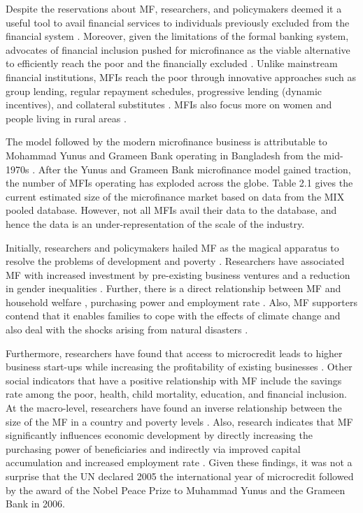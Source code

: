 \documentclass[a4paper,nobind]{templates/ociamthesis}
\begin{document}
Despite the reservations about MF, researchers, and policymakers deemed it a useful tool to avail financial services to individuals previously excluded from the financial system \autocite{d2017ngos}. Moreover, given the limitations of the formal banking system, advocates of financial inclusion pushed for microfinance as the viable alternative to efficiently reach the poor and the financially excluded \autocite{chester2016one}. Unlike mainstream financial institutions, MFIs reach the poor through innovative approaches such as group lending, regular repayment schedules, progressive lending (dynamic incentives), and collateral substitutes \autocite{chester2016one}. MFIs also focus more on women and people living in rural areas \autocite{ghosh2013microfinance}.

The model followed by the modern microfinance business is attributable to Mohammad Yunus and Grameen Bank operating in Bangladesh from the mid-1970s \autocite{ghosh2013microfinance}. After the Yunus and Grameen Bank microfinance model gained traction, the number of MFIs operating has exploded across the globe. Table 2.1 gives the current estimated size of the microfinance market based on data from the MIX pooled database. However, not all MFIs avail their data to the database, and hence the data is an under-representation of the scale of the industry.

Initially, researchers and policymakers hailed MF as the magical apparatus to resolve the problems of development and poverty \autocite{ghosh2013microfinance}. Researchers have associated MF with increased investment by pre-existing business ventures \textcite{newman2017microfinance} and a reduction in gender inequalities \autocites{shahriar2017lender}[@][]{newman2017microfinance,mafukata2017reciprocal,zhang2017microfinance}. Further, there is a direct relationship between MF and household welfare \autocite{meador2017food,you2013role}, purchasing power and employment rate \autocite{lopatta2016microfinance,raihan2017macro}. Also, MF supporters contend that it enables families to cope with the effects of climate change \textcite{fenton2017role} and also deal with the shocks arising from natural disasters \autocite{calis2017does}.

Furthermore, researchers have found that access to microcredit leads to higher business start-ups while increasing the profitability of existing businesses \autocite{demirguc2017financial}. Other social indicators that have a positive relationship with MF include the savings rate among the poor, health, child mortality, education, and financial inclusion\autocite{shahriar2017lender,o2017systematic}. At the macro-level, researchers have found an inverse relationship between the size of the MF in a country and poverty levels \autocite{ahlin2011does}. Also, research indicates that MF significantly influences economic development by directly increasing the purchasing power of beneficiaries and indirectly via improved capital accumulation and increased employment rate \autocite{lopatta2016microfinance,raihan2017macro}. Given these findings, it was not a surprise that the UN declared 2005 the international year of microcredit followed by the award of the Nobel Peace Prize to Muhammad Yunus and the Grameen Bank in 2006.
\end{document}
